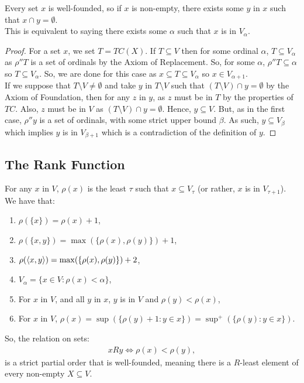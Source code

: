 Every set $x$ is well-founded, so if $x$ is non-empty, there exists
some $y$ in $x$ such that $x \cap y = \emptyset$.
\\[\baselineskip]
This is equivalent to saying there exists some $\alpha$ such that
$x$ is in $V_\alpha$.

\begin{proof}
    For a set $x$, we set $T = TC(X)$. 
    If $T \subseteq V$ then for some ordinal $\alpha$,
    $T \subseteq V_\alpha$ as $\rho''T$ is a set of ordinals by
    the Axiom of Replacement. So, for some $\alpha$, $\rho''T \subseteq \alpha$
    so $T \subseteq V_\alpha$. So, we are done for this case as
    $x \subseteq T \subseteq V_\alpha$ so $x \in V_{\alpha + 1}$.
    \\[\baselineskip]
    If we suppose that $T \setminus V \neq \emptyset$ and take $y$ in
    $T \setminus V$ such that $(T \setminus V) \cap y = \emptyset$
    by the Axiom of Foundation, then for any $z$ in $y$, 
    as $z$ must be in $T$ by the properties of $TC$.
    Also, $z$ must be in $V$ as $(T \setminus V) \cap y = \emptyset$.
    Hence, $y \subseteq V$. But, as in the first case, $\rho''y$ is a set
    of ordinals, with some strict upper bound $\beta$. As such, 
    $y \subseteq V_\beta$ which implies $y$ is in $V_{\beta + 1}$
    which is a contradiction of the definition of $y$.
\end{proof}

\subsection{The Rank Function} \label{6.5}

For any $x$ in $V$, $\rho(x)$ is the least 
$\tau$ such that $x \subseteq V_\tau$ (or rather, $x$ is in $V_{\tau + 1}$). 
We have that: \begin{enumerate}
    \item $\rho(\{x\}) = \rho(x) + 1$,
    \item $\rho(\{x, y\}) = \max(\{\rho(x), \rho(y)\}) + 1$,
    \item $\rho({\langle x, y \rangle}) = \max(\{\rho(x), \rho(y)\}) + 2$,
    \item $V_\alpha = \{x \in V : \rho(x) < \alpha\}$,
    \item For $x$ in $V$, and all $y$ in $x$, $y$ is in $V$ and
        $\rho(y) < \rho(x)$,
    \item For $x$ in $V$, $\rho(x) 
        = \sup(\{\rho(y) + 1 : y \in x\})
        = \sup^+(\{\rho(y) : y \in x\})$.
\end{enumerate} So, the relation on sets: \begin{align*}
    xRy \Longleftrightarrow \rho(x) < \rho(y),
\end{align*} is a strict partial order that is well-founded, meaning
there is a $R$-least element of every non-empty $X \subseteq V$.

